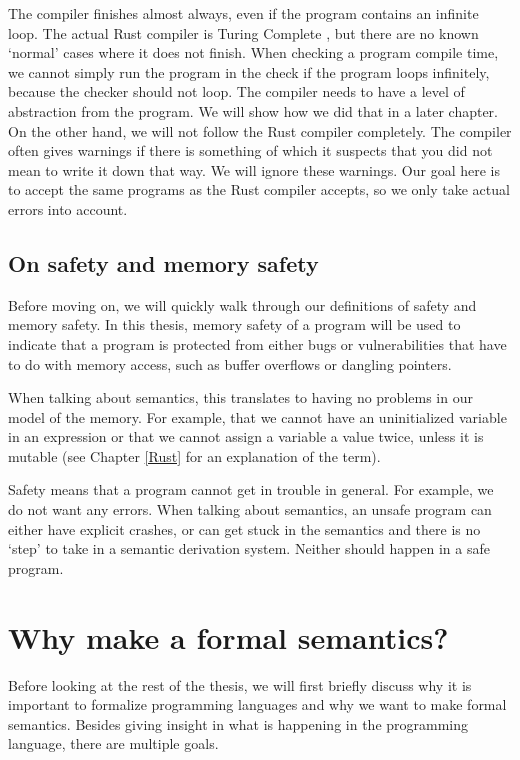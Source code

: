 The compiler finishes almost always, even if the program contains an infinite loop. The actual Rust compiler is Turing Complete \citep{compiler}, but there are no known `normal' cases where it does not finish. When checking a program compile time, we cannot simply run the program in the check if the program loops infinitely, because the checker should not loop. The compiler needs to have a level of abstraction from the program. We will show how we did that in a later chapter. On the other hand, we will not follow the Rust compiler completely. The compiler often gives warnings if there is something of which it suspects that you did not mean to write it down that way. We will ignore these warnings. Our goal here is to accept the same programs as the Rust compiler accepts, so we only take actual errors into account. 

\subsection{On safety and memory safety}
Before moving on, we will quickly walk through our definitions of safety and memory safety. In this thesis, memory safety of a program will be used to indicate that a program is protected from either bugs or vulnerabilities that have to do with memory access, such as buffer overflows or dangling pointers. 

When talking about semantics, this translates to having no problems in our model of the memory. For example, that we cannot have an uninitialized variable in an expression or that we cannot assign a variable a value twice, unless it is mutable (see Chapter \ref{Rust} for an explanation of the term). 

Safety means that a program cannot get in trouble in general. For example, we do not want any errors. When talking about semantics, an unsafe program can either have explicit crashes, or can get stuck in the semantics and there is no `step' to take in a semantic derivation system. Neither should happen in a safe program. 

\section{Why make a formal semantics?}
Before looking at the rest of the thesis, we will first briefly discuss why it is important to formalize programming languages and why we want to make formal semantics. Besides giving insight in what is happening in the programming language, there are multiple goals.

